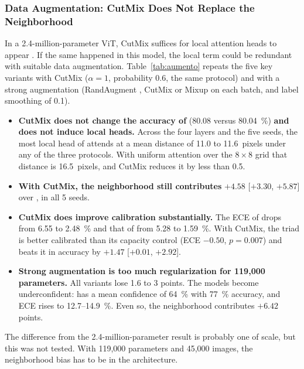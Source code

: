 

\subsubsection{Data Augmentation: CutMix Does Not Replace the Neighborhood}
\label{sec:res-aumento}
In a 2.4-million-parameter ViT, CutMix suffices for local attention heads to appear \cite{santiago2026inducing}. If the same happened in this model, the local term could be redundant with suitable data augmentation. Table~\ref{tab:aumento} repeats the five key variants with CutMix ($\alpha=1$, probability 0.6, the same protocol) and with a strong augmentation (RandAugment \cite{cubuk2020randaugment}, CutMix \cite{yun2019cutmix} or Mixup \cite{zhang2018mixup} on each batch, and label smoothing \cite{szegedy2016rethinking} of 0.1).
\begin{itemize}
  \item \textbf{CutMix does not change the accuracy of } (80.08 versus 80.04~\%) \textbf{and does not induce local heads.} Across the four layers and the five seeds, the most local head of  attends at a mean distance of 11.0 to 11.6~pixels under any of the three protocols. With uniform attention over the $8\times8$ grid that distance is 16.5~pixels, and CutMix reduces it by less than 0.5.
  \item \textbf{With CutMix, the neighborhood still contributes} $+4.58$ [$+3.30$, $+5.87$] over , in all 5 seeds.
  \item \textbf{CutMix does improve calibration substantially.} The ECE of  drops from 6.55 to 2.48~\% and that of  from 5.28 to 1.59~\%. With CutMix, the triad is better calibrated than its capacity control (ECE $-0.50$, $p=0.007$) and beats it in accuracy by $+1.47$ [$+0.01$, $+2.92$].
  \item \textbf{Strong augmentation is too much regularization for 119,000 parameters.} All variants lose 1.6 to 3 points. The models become underconfident:  has a mean confidence of 64~\% with 77~\% accuracy, and ECE rises to 12.7--14.9~\%. Even so, the neighborhood contributes $+6.42$ points.
\end{itemize}
The difference from the 2.4-million-parameter result is probably one of scale, but this was not tested. With 119,000 parameters and 45,000 images, the neighborhood bias has to be in the architecture.



